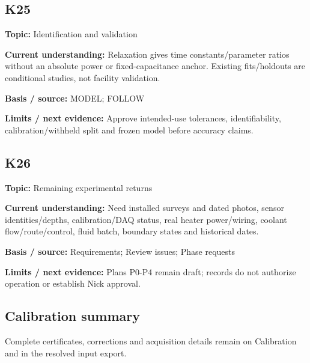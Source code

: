 \documentclass[11pt]{article}
\begin{document}
\par\noindent\begin{minipage}{\textwidth}\small\setlength{\parskip}{2pt}
\subsection*{K25}
\textbf{Topic:} Identification and validation\par
\textbf{Current understanding:} Relaxation gives time constants/parameter ratios without an absolute power or fixed-capacitance anchor. Existing fits/holdouts are conditional studies, not facility validation.\par
\textbf{Basis / source:} MODEL; FOLLOW\par
\textbf{Limits / next evidence:} Approve intended-use tolerances, identifiability, calibration/withheld split and frozen model before accuracy claims.\par
\end{minipage}\par\vspace{5pt}
\par\noindent\begin{minipage}{\textwidth}\small\setlength{\parskip}{2pt}
\subsection*{K26}
\textbf{Topic:} Remaining experimental returns\par
\textbf{Current understanding:} Need installed surveys and dated photos, sensor identities/depths, calibration/DAQ status, real heater power/wiring, coolant flow/route/control, fluid batch, boundary states and historical dates.\par
\textbf{Basis / source:} Requirements; Review issues; Phase requests\par
\textbf{Limits / next evidence:} Plans P0-P4 remain draft; records do not authorize operation or establish Nick approval.\par
\end{minipage}\par\vspace{5pt}
\clearpage\subsection{Calibration summary}\label{calibration-detail}
Complete certificates, corrections and acquisition details remain on Calibration and in the resolved input export.
\small\setlength{\tabcolsep}{4pt}
\end{document}
